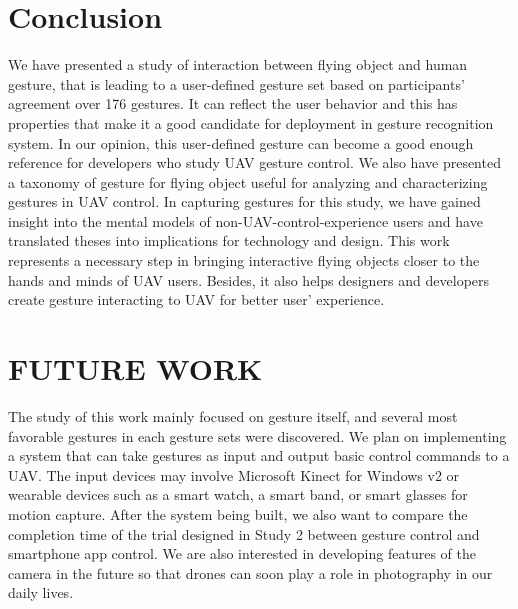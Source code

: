 \documentclass{sigchi}
\begin{document}



\section{Conclusion}

We have presented a study of interaction between flying object and  human gesture, that is leading to a user-defined gesture set based on participants' agreement over 176 gestures. It can reflect the user behavior and this has properties that make it a good candidate for deployment in gesture recognition system. In our opinion, this user-defined gesture can become a good enough reference for developers who study UAV gesture control. We also have presented a taxonomy of gesture for flying object useful for analyzing and characterizing gestures in UAV control. In capturing gestures for this study, we have gained insight into the mental models of non-UAV-control-experience users and have translated theses into implications for technology and design. This work represents a necessary step in bringing interactive flying objects closer to the hands and minds of UAV users. Besides, it also helps designers and developers create gesture interacting to UAV for better user' experience. 


\section{FUTURE WORK}

The study of this work mainly focused on gesture itself, and several most favorable gestures in each gesture sets were discovered. We plan on implementing a system that can take gestures as input and output basic control commands to a UAV. The input devices may involve Microsoft Kinect for Windows v2 or wearable devices such as a smart watch, a smart band, or smart glasses for motion capture. After the system being built, we also want to compare the completion time of the trial designed in Study 2 between gesture control and smartphone app control. We are also interested in developing features of the camera in the future so that drones can soon play a role in photography in our daily lives.
\end{document}
